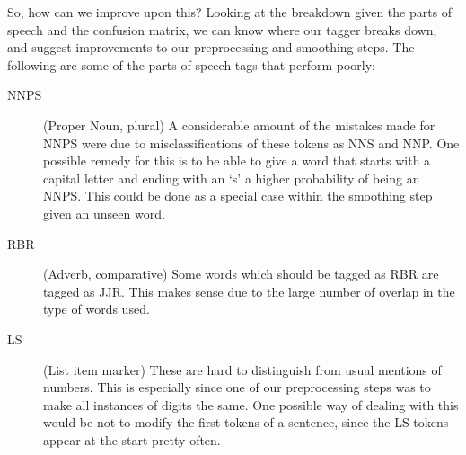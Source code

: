 \documentclass[12pt]{homework}
\begin{document}
So, how can we improve upon this? Looking at the breakdown given the parts of 
speech and the confusion matrix, we can know where our tagger breaks down, and 
suggest improvements to our preprocessing and smoothing steps. The following are 
some of the parts of speech tags that perform poorly:
\begin{description}
	\item[NNPS] (Proper Noun, plural) A considerable amount of the mistakes made 
		for NNPS were due to misclassifications of these tokens as NNS and NNP. 
		One possible remedy for this is to be able to give a word that starts 
		with a capital letter and ending with an `s' a higher probability of 
		being an NNPS. This could be done as a special case within the smoothing 
		step given an unseen word.
	\item[RBR] (Adverb, comparative) Some words which should be tagged as RBR 
		are tagged as JJR. This makes sense due to the large number of overlap 
		in the type of words used.
	\item[LS] (List item marker) These are hard to distinguish from usual 
		mentions of numbers. This is especially since one of our preprocessing 
		steps was to make all instances of digits the same. One possible way of 
		dealing with this would be not to modify the first tokens of a sentence, 
		since the LS tokens appear at the start pretty often.
\end{description}
\end{document}
